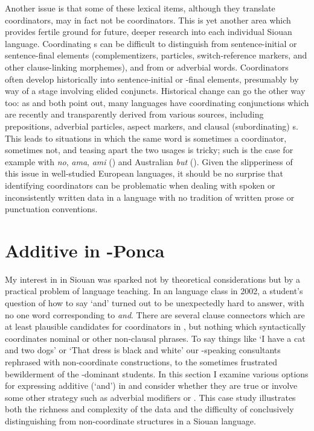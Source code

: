 \documentclass[output=paper]{LSP/langsci}
\begin{document}
Another issue is that some of these lexical items, although they translate  coordinators, may in fact not be coordinators. This is yet another area which provides fertile ground for future, deeper research into each individual Siouan language. Coordinating s can be difficult to distinguish from sentence-initial or sentence-final elements (complementizers,  particles, switch-reference markers, and other clause-linking morphemes), and from  or adverbial words. Coordinators often develop historically into sentence-initial or -final elements, presumably by way of a stage involving elided conjuncts. Historical change can go the other way too: as \citet{Mithun1988} and \citet{Stassen2000} both point out, many languages have coordinating conjunctions which are recently and transparently derived from various sources, including  prepositions, adverbial particles, aspect markers, and clausal (subordinating) s. This leads to situations in which the same word is sometimes a coordinator, sometimes not, and teasing apart the two usages is tricky; such is the case for example with  \textit{no}, \textit{ama}, \textit{ami} (\citealt{Fielder2008}) and Australian  \textit{but} (\citealt{MulderThompson2008}). Given the slipperiness of this issue in well-studied European languages, it should be no surprise that identifying coordinators can be problematic when dealing with spoken or inconsistently written data in a language with no tradition of written prose or punctuation conventions.

\section{Additive  in -Ponca}\label{sec:rudin:3}

My interest in  in Siouan was sparked not by theoretical considerations but by a practical problem of language teaching. In an  language class in 2002, a student's question of how to say `and' turned out to be unexpectedly hard to answer, with no one word corresponding to  \textit{and}. There are several clause connectors which are at least plausible candidates for coordinators in , but nothing which syntactically coordinates nominal or other non-clausal phrases. To say things like `I have a cat and two dogs' or `That dress is black and white' our -speaking consultants rephrased with non-coordinate constructions, to the sometimes frustrated bewilderment of the -dominant students.  In this section I examine various options for expressing additive  (`and') in  and consider whether they are true  or involve some other strategy such as adverbial modifiers or . This case study illustrates both the richness and complexity of the data and the difficulty of conclusively distinguishing  from non-coordinate structures in a Siouan language.
\end{document}
